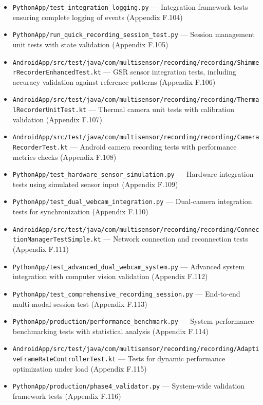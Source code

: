 {{\begin{itemize}
\item \texttt{PythonApp/test_integration_logging.py} --- Integration framework tests
  ensuring complete logging of events (Appendix F.104)
\item \texttt{PythonApp/run_quick_recording_session_test.py} --- Session management
  unit tests with state validation (Appendix F.105)
\item \texttt{AndroidApp/src/test/java/com/multisensor/recording/recording/ShimmerRecorderEnhancedTest.kt}
  --- GSR sensor integration tests, including accuracy validation against
  reference patterns (Appendix F.106)
\item \texttt{AndroidApp/src/test/java/com/multisensor/recording/recording/ThermalRecorderUnitTest.kt}
  --- Thermal camera unit tests with calibration validation (Appendix
  F.107)
\item \texttt{AndroidApp/src/test/java/com/multisensor/recording/recording/CameraRecorderTest.kt}
  --- Android camera recording tests with performance metrics checks
  (Appendix F.108)
\item \texttt{PythonApp/test_hardware_sensor_simulation.py} --- Hardware integration
  tests using simulated sensor input (Appendix F.109)
\item \texttt{PythonApp/test_dual_webcam_integration.py} --- Dual-camera integration
  tests for synchronization (Appendix F.110)
\item \texttt{AndroidApp/src/test/java/com/multisensor/recording/recording/ConnectionManagerTestSimple.kt}
  --- Network connection and reconnection tests (Appendix F.111)
\item \texttt{PythonApp/test_advanced_dual_webcam_system.py} --- Advanced system
  integration with computer vision validation (Appendix F.112)
\item \texttt{PythonApp/test_comprehensive_recording_session.py} --- End-to-end
  multi-modal session test (Appendix F.113)
\item \texttt{PythonApp/production/performance_benchmark.py} --- System performance
  benchmarking tests with statistical analysis (Appendix F.114)
\item \texttt{AndroidApp/src/test/java/com/multisensor/recording/recording/AdaptiveFrameRateControllerTest.kt}
  --- Tests for dynamic performance optimization under load (Appendix
  F.115)
\item \texttt{PythonApp/production/phase4_validator.py} --- System-wide validation
  framework tests (Appendix F.116)

\end{itemize}}}
